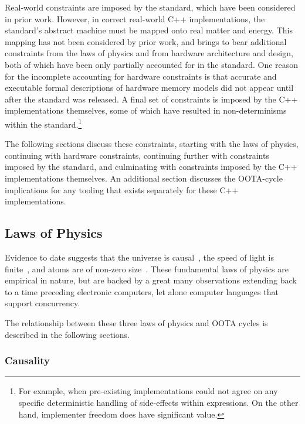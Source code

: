 \documentclass[10]{article}
\begin{document}
Real-world constraints are imposed by the standard, which have been
considered in prior work.
However, in correct real-world C++ implementations, the standard's
abstract machine must be mapped onto real matter and energy.
This mapping has not been considered by prior work, and brings to
bear additional constraints from the laws of physics and from hardware
architecture and design, both of which have been only partially accounted
for in the standard.
One reason for the incomplete accounting for hardware constraints is
that accurate and executable formal descriptions of hardware memory
models did not appear until after the standard was released.
A final set of constraints is imposed by the C++ implementations
themselves, some of which have resulted in non-determinisms within
the standard.\footnote{
	For example, when pre-existing implementations could not agree
	on any specific deterministic handling of side-effects within
	expressions.
	On the other hand, implementer freedom does have significant
	value.}

The following sections discuss these constraints, starting with the
laws of physics, continuing with hardware constraints, continuing
further with constraints imposed by the standard, and culminating
with constraints imposed by the C++ implementations themselves.
An additional section discusses the OOTA-cycle implications for
any tooling that exists separately for these C++ implementations.

\subsection{Laws of Physics}
\label{sec:Laws of Physics}

Evidence to date suggests that the universe is
causal~\cite{Plato360BC-causality},
the speed of light is finite~\cite{OleRoemer1671SpeedOfLight}, and
atoms are of non-zero size~\cite{JeanBaptistePerrin1923AtomSize}.
These fundamental laws of physics are empirical in nature, but
are backed by a great many observations extending back to a time
preceding electronic computers, let alone computer languages that
support concurrency.

The relationship between these three laws of physics and OOTA
cycles is described in the following sections.

\subsubsection{Causality}
\label{sec:Causality}
\end{document}
